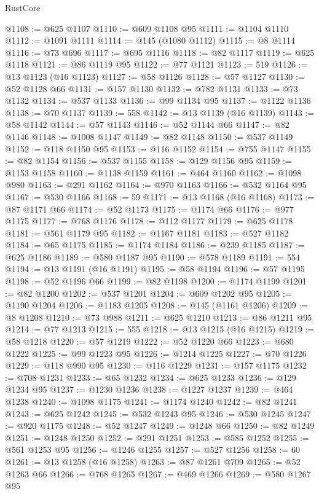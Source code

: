 \begin{lexlean}{RustCore}
\begin{coremodule}
@1108 := @625 @1107
@1110 := @609 @1108 @95
@1111 := @1104 @1110
@1112 := @1091 @1111
@1114 := @145 (@1080 @1112)
@1115 := @8 @1114
@1116 := @73 @696
@1117 := @695 @1116
@1118 := @82 @1117
@1119 := @625 @1118
@1121 := @86 @1119 @95
@1122 := @77 @1121
@1123 := 519
@1126 := @13 @1123 (@16 @1123)
@1127 := @58 @1126
@1128 := @57 @1127
@1130 := @52 @1128 @66
@1131 := @157 @1130
@1132 := @782 @1131
@1133 := @73 @1132
@1134 := @537 @1133
@1136 := @99 @1134 @95
@1137 := @1122 @1136
@1138 := @70 @1137
@1139 := 558
@1142 := @13 @1139 (@16 @1139)
@1143 := @58 @1142
@1144 := @57 @1143
@1146 := @52 @1144 @66
@1147 := @82 @1146
@1148 := @1008 @1147
@1149 := @82 @1148
@1150 := @537 @1149
@1152 := @118 @1150 @95
@1153 := @116 @1152
@1154 := @755 @1147
@1155 := @82 @1154
@1156 := @537 @1155
@1158 := @129 @1156 @95
@1159 := @1153 @1158
@1160 := @1138 @1159
@1161 := @464 @1160
@1162 := @1098 @980
@1163 := @291 @1162
@1164 := @970 @1163
@1166 := @532 @1164 @95
@1167 := @530 @1166
@1168 := 59
@1171 := @13 @1168 (@16 @1168)
@1173 := @87 @1171 @66
@1174 := @52 @1173
@1175 := @1174 @66
@1176 := @977 @1175
@1177 := @768 @1176
@1178 := @112 @1177
@1179 := @625 @1178
@1181 := @561 @1179 @95
@1182 := @1167 @1181
@1183 := @527 @1182
@1184 := @65 @1175
@1185 := @1174 @1184
@1186 := @239 @1185
@1187 := @625 @1186
@1189 := @580 @1187 @95
@1190 := @578 @1189
@1191 := 554
@1194 := @13 @1191 (@16 @1191)
@1195 := @58 @1194
@1196 := @57 @1195
@1198 := @52 @1196 @66
@1199 := @82 @1198
@1200 := @1174 @1199
@1201 := @82 @1200
@1202 := @537 @1201
@1204 := @609 @1202 @95
@1205 := @1190 @1204
@1206 := @1183 @1205
@1208 := @145 (@1161 @1206)
@1209 := @8 @1208
@1210 := @73 @988
@1211 := @625 @1210
@1213 := @86 @1211 @95
@1214 := @77 @1213
@1215 := 555
@1218 := @13 @1215 (@16 @1215)
@1219 := @58 @1218
@1220 := @57 @1219
@1222 := @52 @1220 @66
@1223 := @680 @1222
@1225 := @99 @1223 @95
@1226 := @1214 @1225
@1227 := @70 @1226
@1229 := @118 @990 @95
@1230 := @116 @1229
@1231 := @157 @1175
@1232 := @708 @1231
@1233 := @65 @1232
@1234 := @625 @1233
@1236 := @129 @1234 @95
@1237 := @1230 @1236
@1238 := @1227 @1237
@1239 := @464 @1238
@1240 := @1098 @1175
@1241 := @1174 @1240
@1242 := @82 @1241
@1243 := @625 @1242
@1245 := @532 @1243 @95
@1246 := @530 @1245
@1247 := @920 @1175
@1248 := @52 @1247
@1249 := @1248 @66
@1250 := @82 @1249
@1251 := @1248 @1250
@1252 := @291 @1251
@1253 := @585 @1252
@1255 := @561 @1253 @95
@1256 := @1246 @1255
@1257 := @527 @1256
@1258 := 60
@1261 := @13 @1258 (@16 @1258)
@1263 := @87 @1261 @709
@1265 := @52 @1263 @66
@1266 := @768 @1265
@1267 := @469 @1266
@1269 := @580 @1267 @95

\end{coremodule}
\end{lexlean}
